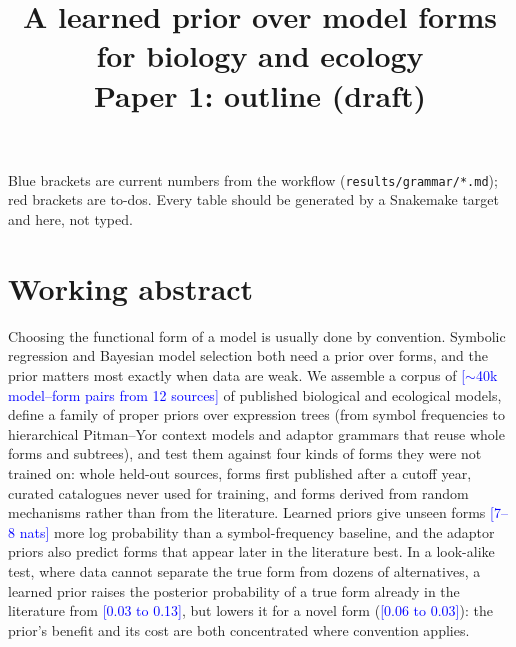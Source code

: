 \documentclass[11pt]{article}
\title{A learned prior over model forms for biology and ecology\\[0.3em]
\large Paper 1: outline (draft)}
\author{}
\date{}
\newcommand{\cur}[1]{\textcolor{blue}{[#1]}}
\begin{document}
\maketitle

\noindent Blue brackets are current numbers from the workflow (\texttt{results/grammar/*.md}); red brackets
are to-dos. Every table should be generated by a Snakemake target and \verb|| here, not typed.

\section*{Working abstract}
Choosing the functional form of a model is usually done by convention. Symbolic regression and Bayesian
model selection both need a prior over forms, and the prior matters most exactly when data are weak.
We assemble a corpus of \cur{$\sim$40k model--form pairs from 12 sources} of published biological and
ecological models, define a family of proper priors over expression trees (from symbol frequencies to
hierarchical Pitman--Yor context models and adaptor grammars that reuse whole forms and subtrees), and
test them against four kinds of forms they were not trained on: whole held-out sources, forms first
published after a cutoff year, curated catalogues never used for training, and forms derived from random
mechanisms rather than from the literature. Learned priors give unseen forms \cur{7--8 nats} more log
probability than a symbol-frequency baseline, and the adaptor priors also predict forms that appear
later in the literature best. In a look-alike test, where data cannot separate the true form from
dozens of alternatives, a learned prior raises the posterior probability of a true form already in
the literature from \cur{0.03 to 0.13}, but lowers it for a novel form (\cur{0.06 to 0.03}): the
prior's benefit and its cost are both concentrated where convention applies.

\end{document}

